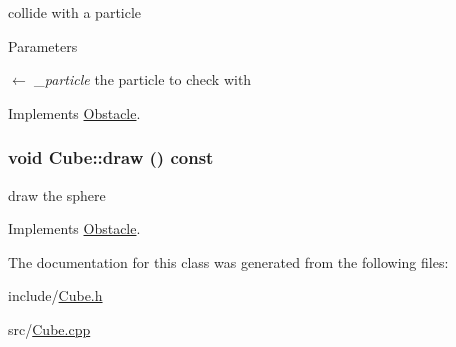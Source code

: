 collide with a particle 
\begin{DoxyParams}{Parameters}
\item[\mbox{$\leftarrow$} {\em \_\-particle}]the particle to check with \end{DoxyParams}


Implements \hyperlink{classObstacle_ae35a1937df593d5caf25c5545acbaffd}{Obstacle}.\hypertarget{classCube_ab4dbd130d15e86b30212dad3189d1016}{
\subsubsection[{draw}]{\setlength{\rightskip}{0pt plus 5cm}void Cube::draw () const}}
\label{classCube_ab4dbd130d15e86b30212dad3189d1016}


draw the sphere 

Implements \hyperlink{classObstacle_a7476b22bcd25e3731a0ef2aa5324afa0}{Obstacle}.

The documentation for this class was generated from the following files:\begin{DoxyCompactItemize}
\item 
include/\hyperlink{Cube_8h}{Cube.h}\item 
src/\hyperlink{Cube_8cpp}{Cube.cpp}\end{DoxyCompactItemize}
